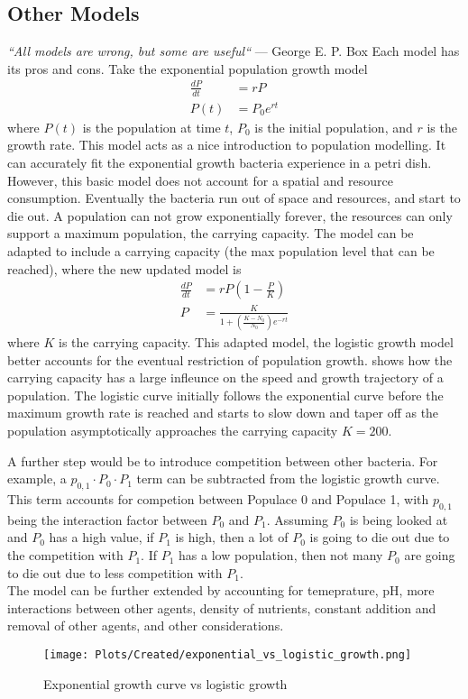 \subsection{Other Models}
\textit{“All models are wrong, but some are useful“} — George E. P. Box \newline \newline
Each model has its pros and cons. 
Take the exponential population growth model 
\begin{align}
    \frac{dP}{dt} &= rP \\
    P(t) &= P_0e^{rt} 
\end{align}
where $P(t)$ is the population at time $t$, $P_0$ is the initial population, and $r$ is the growth rate. 
This model acts as a nice introduction to population modelling. It can accurately fit the exponential growth bacteria experience in a petri dish. 
However, this basic model does not account for a spatial and resource consumption. 
Eventually the bacteria run out of space and resources, and start to die out. 
A population can not grow exponentially forever, the resources can only support a maximum population, the carrying capacity. 
The model can be adapted to include a carrying capacity (the max population level that can be reached), where the new updated model is 
\begin{align}
    \frac{dP}{dt} &= rP(1-\frac{P}{K}) \\ 
    P &= \frac{K}{1 + (\frac{K-N_0}{N_0})e^{-rt}}
\end{align}
where $K$ is the carrying capacity. This adapted model, the logistic growth model better accounts for the eventual restriction of population growth. 
\newline
{} shows how the carrying capacity has a large infleunce on the speed and growth trajectory of a population. 
The logistic curve initially follows the exponential curve before the maximum growth rate is reached and starts to slow down and taper off as the population asymptotically approaches the carrying capacity $K=200$. 

A further step would be to introduce competition between other bacteria. 
For example, a $p_{0, 1}\cdot P_0 \cdot P_1$ term can be subtracted from the logistic growth curve. 
This term accounts for competion between Populace 0 and Populace 1, with $p_{0, 1}$ being the interaction factor between $P_0$ and $P_1$. 
Assuming $P_0$ is being looked at and $P_0$ has a high value, if $P_1$ is high, then a lot of $P_0$ is going to die out due to the competition with $P_1$. 
If $P_1$ has a low population, then not many $P_0$ are going to die out due to less competition with $P_1$. \\ 

The model can be further extended by accounting for temeprature, pH, more interactions between other agents, density of nutrients, constant addition and removal of other agents, and other considerations.

\begin{figure}
    \centering
    \texttt{[image: Plots/Created/exponential\_vs\_logistic\_growth.png]}
    \caption{Exponential growth curve vs logistic growth}
    \label{fig:created:exponential_vs_logistic_growth}
\end{figure}
